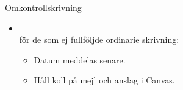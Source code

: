 
\begin{Slide}{Omkontrollskrivning}
  \begin{itemize}
    \item {}\\för de som ej fullföljde ordinarie skrivning:
    \begin{itemize}
      \item Datum meddelas senare. %
      \item Håll koll på mejl och anslag i Canvas.
    \end{itemize}
  \end{itemize}
\end{Slide}

    
